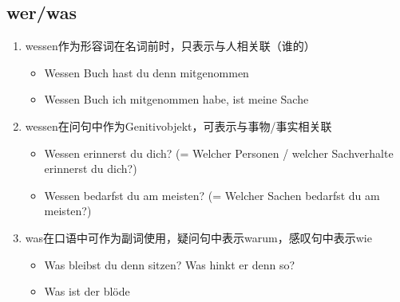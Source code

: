 \documentclass[UTF8]{report}
\begin{document}
\subsection{wer/was}
\begin{enumerate}
    \item wessen作为形容词在名词前时，只表示与人相关联（谁的）
    \begin{itemize}
        \item Wessen Buch hast du denn mitgenommen
        \item Wessen Buch ich mitgenommen habe, ist meine Sache
    \end{itemize}
    \item wessen在问句中作为Genitivobjekt，可表示与事物/事实相关联
    \begin{itemize}
        \item Wessen erinnerst du dich? (= Welcher Personen / welcher Sachverhalte erinnerst du dich?)
        \item Wessen bedarfst du am meisten? (= Welcher Sachen bedarfst du am meisten?) 
    \end{itemize}
    \item was在口语中可作为副词使用，疑问句中表示warum，感叹句中表示wie
    \begin{itemize}
        \item Was bleibst du denn sitzen? Was hinkt er denn so? 
        \item Was ist der blöde
    \end{itemize}
\end{enumerate}
\end{document}
